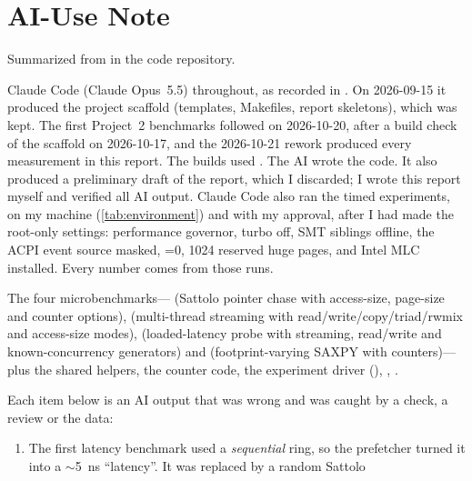 \section{AI-Use Note}\label{sec:ai-use}

Summarized from  in the code repository.

\begin{description}[style=nextline]
  \item[Tools used] Claude Code (Claude Opus~5.5) throughout, as recorded in .
        On 2026-09-15 it produced the project scaffold (templates, Makefiles, report skeletons),
        which was kept. The first Project~2 benchmarks followed on 2026-10-20, after a build
        check of the scaffold on 2026-10-17, and the 2026-10-21 rework produced every
        measurement in this report. The builds used \sysGCC{}. The AI wrote the code. It also produced a
        preliminary draft of the report, which I discarded; I wrote this report myself and verified all
        AI output. Claude Code also ran the timed experiments, on my machine (\cref{tab:environment})
        and with my approval, after I had made the root-only settings: performance governor, turbo
        off, SMT siblings offline, the ACPI event source masked, =0, 1024
        reserved huge pages, and Intel MLC installed. Every number comes from those runs.
  \item[What they helped generate] The four microbenchmarks--- (Sattolo
        pointer chase with access-size, page-size and counter options),  (multi-thread
        streaming with read/write/copy/triad/rwmix and access-size modes),  (loaded-latency
        probe with streaming, read/write and known-concurrency generators) and 
        (footprint-varying SAXPY with counters)---plus the shared helpers, the  counter
        code, the experiment driver (), , .
  \item[What was independently modified, tested, or rejected] Each item below is an AI output that was
        wrong and was caught by a check, a review or the data:
        \begin{enumerate}[(1),nosep,leftmargin=*]
          \item The first latency benchmark used a \emph{sequential} ring, so the prefetcher turned it
                into a \ensuremath{\sim}\qty{5}{\nano\second} ``latency''. It was replaced by a random Sattolo

\end{enumerate}
\end{description}
